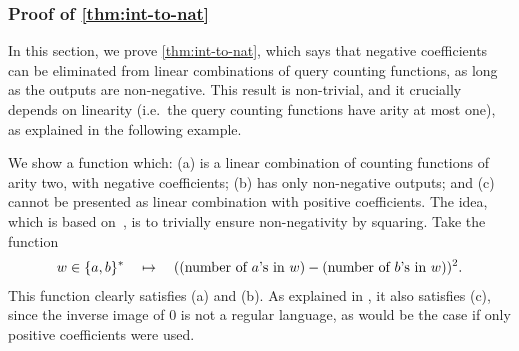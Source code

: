 \subsubsection{Proof of \cref{thm:int-to-nat}}
\label{sec:non-negative}
In this section, we prove \cref{thm:int-to-nat},  which says that negative coefficients can be eliminated from linear combinations of query counting functions, as long as the outputs are non-negative. This result is non-trivial, and it crucially depends on linearity (i.e.~the query counting functions have arity at most one), as explained in the following example.

\begin{myexample}\label{ex:quadratic-counterexample}
     We show  a function which: (a) is a linear combination of \mso  counting functions of arity two, with negative coefficients; (b) has only non-negative outputs; and (c) cannot be presented as linear combination with positive coefficients. The idea, which is based on~\cite[Example 2.1]{BerstelReutenauer08}, is to trivially ensure non-negativity by squaring. Take the function
\begin{align*}
w \in \{a,b\}^* 
\quad \mapsto \quad 
(\text{(number of $a$'s in $w$)} - \text{(number of $b$'s in $w$)})^2.
\end{align*}
This function clearly satisfies (a) and (b). As explained in \cite[p.3]{Zpolyreg23}, it also satisfies (c), since the inverse image of $0$ is not a regular language, as would be the case if only positive coefficients were used.
\end{myexample}

